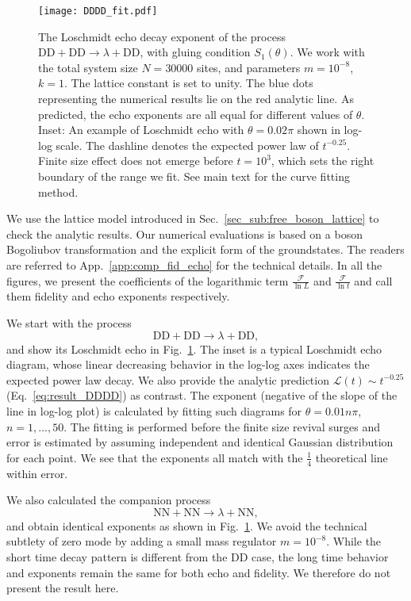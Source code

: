 \begin{figure}[h]
\texttt{[image: DDDD\_fit.pdf]}
\caption{The Loschmidt echo decay exponent of the process $\text{DD}+\text{DD}\rightarrow\lambda+\text{DD}$, with gluing condition $S_1(\theta)$. We work with the total system size $N = 30000$ sites, and parameters $m = 10^{-8}$, $k = 1$. The lattice constant is set to unity. The blue dots representing the numerical results lie on the red analytic line. As predicted, the echo exponents are all equal for different values of $\theta$. Inset: An example of Loschmidt echo with $\theta = 0.02 \pi$ shown in log-log scale. The dashline denotes the expected power law of $t^{-0.25}$. Finite size effect does not emerge before $t=10^{3}$, which sets the right boundary of the range we fit. See main text for the curve fitting method.}
\label{fig:DDDD}
\end{figure}

We use the lattice model introduced in Sec.~\ref{sec_sub:free_boson_lattice} to check the analytic results. Our numerical evaluations is based on a boson Bogoliubov transformation and the explicit form of the groundstates. The readers are referred to App.~\ref{app:comp_fid_echo} for the technical details. In all the figures, we present the coefficients of the logarithmic term $\frac{\mathcal{F}}{\ln L}$ and $\frac{\mathcal{F} }{\ln t}$ and call them fidelity and echo exponents respectively. 

We start with the process
\begin{equation}
\text{DD}+\text{DD}\rightarrow\lambda+\text{DD},
\end{equation}
and show its Loschmidt echo in Fig.~\ref{fig:DDDD}. The inset is a typical Loschmidt echo diagram, whose linear decreasing behavior in the log-log axes indicates the expected power law decay. We also provide the analytic prediction $\mathcal{L}(t)\sim t^{-0.25}$ (\cf Eq.~\eqref{eq:result_DDDD}) as contrast. The exponent (negative of the slope of the line in log-log plot) is calculated by fitting such diagrams for $\theta = 0.01n \pi$, $n = 1,...,50 $. The fitting is performed before the finite size revival surges and error is estimated by assuming independent and identical Gaussian distribution for each point. We see that the exponents all match with the $\frac{1}{4}$ theoretical line within error. 

We also calculated the companion process
\begin{equation}
 \text{NN}+\text{NN}\rightarrow\lambda+\text{NN},
\end{equation}
and obtain identical exponents as shown in Fig.~\ref{fig:DDDD}. We avoid the technical subtlety of zero mode by adding a small mass regulator $m=10^{-8}$. While the short time decay pattern is different from the DD case, the long time behavior and exponents remain the same for both echo and fidelity. We therefore do not present the result here. 

